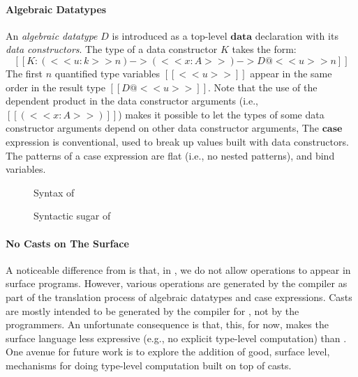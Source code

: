 \paragraph{Algebraic Datatypes}
An \emph{algebraic datatype} $D$ is introduced as a top-level
$\mathbf{data}$ declaration with its \emph{data constructors}. The type
of a data constructor $K$ takes the form:
\[
[[K : (<<u:k>>n) -> (<<x : A>>) -> D@<<u>>n]]
\]
The first $n$ quantified type variables $[[<<u>>]]$ appear in the same
order in the result type $[[D@<<u>>]]$.  Note that the use of the
dependent product in the data constructor arguments (i.e.,
$[[(<<x:A>>)]]$) makes it possible to let the types of some data
constructor arguments depend on other data constructor arguments,
The $\mathbf{case}$ expression is conventional, used to break up values
built with data constructors.  The patterns of a case expression are
flat (i.e., no nested patterns), and bind variables.

{
\begin{figure}
\resizebox{\columnwidth}{!}{\gram{\ottpgm\ottinterrule
\ottdecl\ottinterrule
\ottu\ottinterrule
\ottp\ottinterrule
\ottE\ottinterrule
\ottGs}}
\caption{Syntax of \sufcc}
\label{fig:surface:syntax}
\end{figure}

\begin{figure}
\resizebox{\columnwidth}{!}{$\ottsurfsugar$} %
\caption{Syntactic sugar of \sufcc}
\label{fig:surface:sugar}
\end{figure}
}

\paragraph{No Casts on The Surface}
A noticeable difference from \name is that, in \sufcc, we do not allow
\cast operations to appear in surface programs. However, various \cast
operations are generated by the compiler as part of the translation
process of algebraic datatypes and case expressions. 
Casts are mostly intended to be generated by the compiler for \sufcc, not
by the programmers. An unfortunate consequence is that, this, for now,
makes the surface language less expressive (e.g., no explicit
type-level computation) than \name. One avenue for future work is to
explore the addition of good, surface level, mechanisms for doing
type-level computation built on top of casts.

